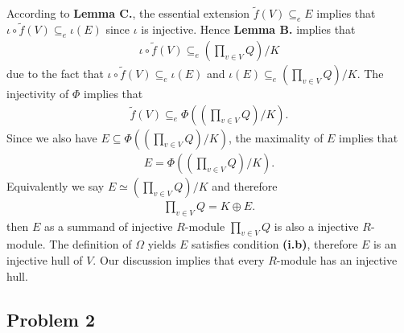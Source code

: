 \begin{solution}
    According to \textbf{Lemma C.}, the essential extension $\tilde{f}(V)\subseteq_e E$ implies that $\iota\circ\tilde{f}(V)\subseteq_e \iota(E)$ since $\iota$ is injective.
    Hence \textbf{Lemma B.} implies that
    \begin{align*}
        \iota\circ\tilde{f}(V)\subseteq_e (\prod_{v\in V} Q)/K
    \end{align*}
    due to the fact that $\iota\circ\tilde{f}(V)\subseteq_e \iota(E)$ and $\iota(E)\subseteq_e (\prod_{v\in V} Q)/K$.
    The injectivity of $\Phi$ implies that 
    \begin{align*}
        \tilde{f}(V)\subseteq_e \Phi\left((\prod_{v\in V} Q)/K\right).
    \end{align*}
    Since we also have $E\subseteq \Phi\left((\prod_{v\in V} Q)/K\right)$,
    the maximality of $E$ implies that 
    \begin{align*}
        E =  \Phi\left((\prod_{v\in V} Q)/K\right).
    \end{align*}
    Equivalently we say $E \simeq (\prod_{v\in V} Q)/K$ and therefore 
    \begin{align*}
        \prod_{v\in V} Q=K\oplus E.
    \end{align*}
    then $E$ as a summand of injective $R$-module $\prod_{v\in V} Q$ is also a injective $R$-module.
    The definition of $\Omega$ yields $E$ satisfies condition \textbf{(i.b)}, therefore $E$ is an injective hull of $V$.
    Our discussion implies that every $R$-module has an injective hull.
\end{solution} 


\subsection*{Problem 2}

